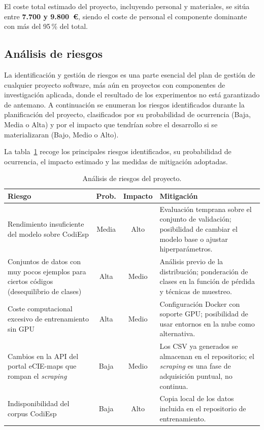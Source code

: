 El coste total estimado del proyecto, incluyendo personal y materiales, se sitúa entre \textbf{7.700 y 9.800~€}, siendo el coste de personal el componente dominante con más del 95\,\% del total.

\subsection{Análisis de riesgos}

La identificación y gestión de riesgos es una parte esencial del plan de gestión de cualquier proyecto software, más aún en proyectos con componentes de investigación aplicada, donde el resultado de los experimentos no está garantizado de antemano. A continuación se enumeran los riesgos identificados durante la planificación del proyecto, clasificados por su probabilidad de ocurrencia (Baja, Media o Alta) y por el impacto que tendrían sobre el desarrollo si se materializaran (Bajo, Medio o Alto).

La tabla~\ref{tab:riesgos} recoge los principales riesgos identificados, su probabilidad de ocurrencia, el impacto estimado y las medidas de mitigación adoptadas.

\begin{table}[h]
\centering
\small
\begin{tabular}{p{4cm}ccp{5cm}}
\hline
\textbf{Riesgo} & \textbf{Prob.} & \textbf{Impacto} & \textbf{Mitigación} \\
\hline
Rendimiento insuficiente del modelo sobre CodiEsp & Media & Alto & Evaluación temprana sobre el conjunto de validación; posibilidad de cambiar el modelo base o ajustar hiperparámetros. \\
\hline
Conjuntos de datos con muy pocos ejemplos para ciertos códigos (desequilibrio de clases) & Alta & Medio & Análisis previo de la distribución; ponderación de clases en la función de pérdida y técnicas de muestreo. \\
Coste computacional excesivo de entrenamiento sin GPU & Alta & Medio & Configuración Docker con soporte GPU; posibilidad de usar entornos en la nube como alternativa. \\
\hline
Cambios en la API del portal eCIE-maps que rompan el \emph{scraping} & Baja & Medio & Los CSV ya generados se almacenan en el repositorio; el \emph{scraping} es una fase de adquisición puntual, no continua. \\
\hline
Indisponibilidad del corpus CodiEsp & Baja & Alto & Copia local de los datos incluida en el repositorio de entrenamiento. \\
\hline
\end{tabular}
\caption{Análisis de riesgos del proyecto.}
\label{tab:riesgos}
\end{table}

